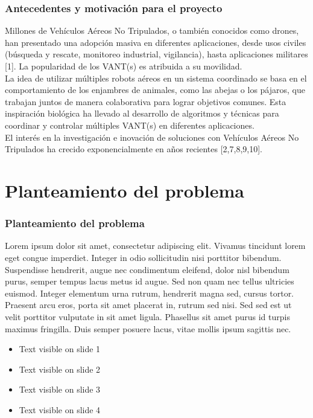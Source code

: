 \documentclass[
	11pt, %
]{beamer}
\begin{document}
\begin{frame}

  \frametitle{Antecedentes y motivación para el proyecto}

  Millones de Vehículos Aéreos No Tripulados, o también conocidos como drones, han presentado una adopción masiva en diferentes aplicaciones, desde usos civiles (búsqueda y rescate, monitoreo industrial, vigilancia), hasta aplicaciones militares [1]. La popularidad de los VANT(s) es atribuida a su movilidad.\\

  La idea de utilizar múltiples robots aéreos en un sistema coordinado se basa en el comportamiento de los enjambres de animales, como las abejas o los pájaros, que trabajan juntos de manera colaborativa para lograr objetivos comunes. Esta inspiración biológica ha llevado al desarrollo de algoritmos y técnicas para coordinar y controlar múltiples VANT(s) en diferentes aplicaciones.\\

  El interés en la investigación e inovación de soluciones con Vehículos Aéreos No Tripulados ha crecido exponencialmente en años recientes [2,7,8,9,10].

  
\end{frame}

\section{Planteamiento del problema}

\begin{frame}
  \frametitle{Planteamiento del problema}

  Lorem ipsum dolor sit amet, consectetur adipiscing elit. Vivamus tincidunt lorem eget congue imperdiet. Integer in odio sollicitudin nisi porttitor bibendum. Suspendisse hendrerit, augue nec condimentum eleifend, dolor nisl bibendum purus, semper tempus lacus metus id augue. Sed non quam nec tellus ultricies euismod. Integer elementum urna rutrum, hendrerit magna sed, cursus tortor. Praesent arcu eros, porta sit amet placerat in, rutrum sed nisi. Sed sed est ut velit porttitor vulputate in sit amet ligula. Phasellus sit amet purus id turpis maximus fringilla. Duis semper posuere lacus, vitae mollis ipsum sagittis nec.\\

  \begin{itemize}
  \item<1-> Text visible on slide 1
  \item<2-> Text visible on slide 2
  \item<3-> Text visible on slide 3
  \item<4-> Text visible on slide 4
  \end{itemize}
  
\end{frame}
\end{document}
